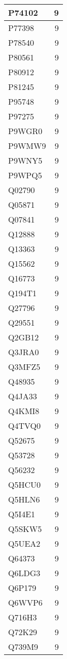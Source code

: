 \documentclass[
]{book}
\theoremstyle{definition}
\theoremstyle{definition}
\theoremstyle{definition}
\theoremstyle{definition}
\theoremstyle{remark}
\begin{document}
\begin{table}
\begin{tabular}{l|r}
\hline
P74102 & 9\\
\hline
P77398 & 9\\
\hline
P78540 & 9\\
\hline
P80561 & 9\\
\hline
P80912 & 9\\
\hline
P81245 & 9\\
\hline
P95748 & 9\\
\hline
P97275 & 9\\
\hline
P9WGR0 & 9\\
\hline
P9WMW9 & 9\\
\hline
P9WNY5 & 9\\
\hline
P9WPQ5 & 9\\
\hline
Q02790 & 9\\
\hline
Q05871 & 9\\
\hline
Q07841 & 9\\
\hline
Q12888 & 9\\
\hline
Q13363 & 9\\
\hline
Q15562 & 9\\
\hline
Q16773 & 9\\
\hline
Q194T1 & 9\\
\hline
Q27796 & 9\\
\hline
Q29551 & 9\\
\hline
Q2GB12 & 9\\
\hline
Q3JRA0 & 9\\
\hline
Q3MFZ5 & 9\\
\hline
Q48935 & 9\\
\hline
Q4JA33 & 9\\
\hline
Q4KMI8 & 9\\
\hline
Q4TVQ0 & 9\\
\hline
Q52675 & 9\\
\hline
Q53728 & 9\\
\hline
Q56232 & 9\\
\hline
Q5HCU0 & 9\\
\hline
Q5HLN6 & 9\\
\hline
Q5I4E1 & 9\\
\hline
Q5SKW5 & 9\\
\hline
Q5UEA2 & 9\\
\hline
Q64373 & 9\\
\hline
Q6LDG3 & 9\\
\hline
Q6P179 & 9\\
\hline
Q6WVP6 & 9\\
\hline
Q716H3 & 9\\
\hline
Q72K29 & 9\\
\hline
Q739M9 & 9\\

\end{tabular}
\end{table}
\end{document}
